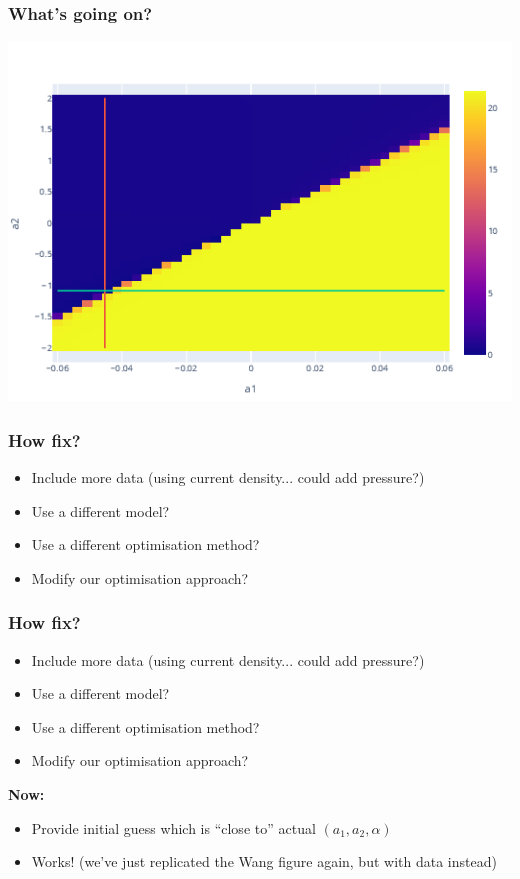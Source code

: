 \documentclass{beamer}
\begin{document}
\begin{frame}
\frametitle{What's going on?}


\centering
\includegraphics[scale=0.65]{imgs/heat-1-entire.png}


\end{frame}
    










\begin{frame}
\frametitle{How fix?}

\begin{itemize}
    \item Include more data (using current density... could add pressure?)
    \item Use a different model?
    \item Use a different optimisation method?
    \item Modify our optimisation approach?
\end{itemize}\vspace{6em}
\end{frame}

\begin{frame}
\frametitle{How fix?}

\begin{itemize}
    \item Include more data (using current density... could add pressure?)
    \item Use a different model?
    \item Use a different optimisation method?
    \item Modify our optimisation approach?
\end{itemize}

\textbf{Now:}
\begin{itemize}
    \item Provide initial guess which is ``close to'' actual $(a_1, a_2, \alpha)$
    \item Works! (we've just replicated the Wang figure again, but with data instead)
\end{itemize}
\end{frame}
\end{document}
